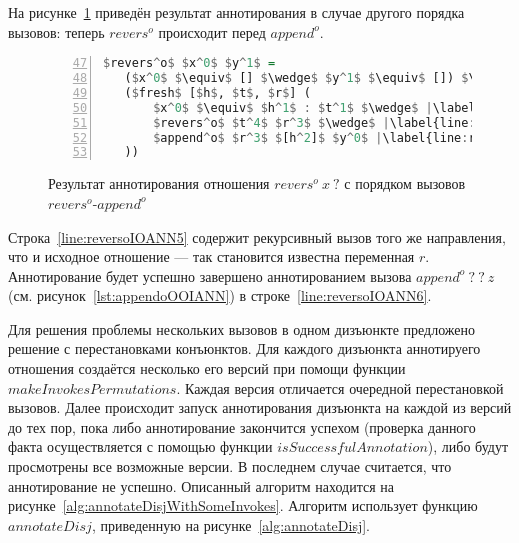 На рисунке~\ref{lst:reversoIOANN} приведён результат аннотирования в случае другого порядка вызовов: теперь $revers^o$ происходит перед $append^o$.

\begin{figure}[h!]
  \begin{center}
  \begin{minipage}{0.5\textwidth}
  \begin{lstlisting}[language=Haskell, frame=single, numbers=left,numberstyle=\small, firstnumber=47, escapechar=|]
 $revers^o$ $x^0$ $y^1$ =
   ($x^0$ $\equiv$ [] $\wedge$ $y^1$ $\equiv$ []) $\vee$ |\label{line:reversoIOANN2}|
   ($fresh$ [$h$, $t$, $r$] (
       $x^0$ $\equiv$ $h^1$ : $t^1$ $\wedge$ |\label{line:reversoIOANN4}|
       $revers^o$ $t^4$ $r^3$ $\wedge$ |\label{line:reversoIOANN5}|
       $append^o$ $r^3$ $[h^2]$ $y^0$ |\label{line:reversoIOANN6}|
   ))
    \end{lstlisting}
  \end{minipage}
  \end{center}
  \caption{Результат аннотирования отношения $revers^o \ x \ ?$ с порядком вызовов $revers^o$-$append^o$}
  \label{lst:reversoIOANN}
\end{figure}

Строка~\ref{line:reversoIOANN5} содержит рекурсивный вызов того же направления, что и исходное отношение --- так становится известна переменная $r$.
Аннотирование будет успешно завершено аннотированием вызова $append^o \ ? \ ? \ z$ (см. рисунок~\ref{lst:appendoOOIANN}) в строке~\ref{line:reversoIOANN6}.

Для решения проблемы нескольких вызовов в одном дизъюнкте предложено решение с перестановками конъюнктов.
Для каждого дизъюнкта аннотируего отношения создаётся несколько его версий при помощи функции $makeInvokesPermutations$.
Каждая версия отличается очередной перестановкой вызовов.
Далее происходит запуск аннотирования дизъюнкта на каждой из версий до тех пор, пока либо аннотирование закончится успехом (проверка данного факта осуществляется с помощью функции $isSuccessfulAnnotation$), либо будут просмотрены все возможные версии.
В последнем случае считается, что аннотирование не успешно.
Описанный алгоритм находится на рисунке~\ref{alg:annotateDisjWithSomeInvokes}.
Алгоритм использует функцию $annotateDisj$, приведенную на рисунке~\ref{alg:annotateDisj}.

